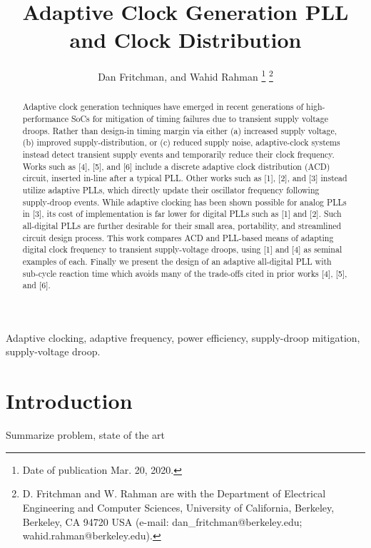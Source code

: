 \documentclass{IEEEtran}
\begin{document}
\title{  Adaptive Clock Generation PLL and Clock Distribution }

\author{
	Dan Fritchman,  and Wahid Rahman 
	\thanks{Date of publication Mar. 20, 2020.}
	\thanks{
		D. Fritchman and W. Rahman are with the Department of Electrical Engineering and Computer Sciences, University of California, Berkeley, Berkeley, CA 94720 USA (e-mail: dan\_fritchman@berkeley.edu; wahid.rahman@berkeley.edu).}
}

\maketitle

\begin{abstract}
Adaptive clock generation techniques have emerged in recent generations of high-performance SoCs for mitigation of timing failures due to transient supply voltage droops. Rather than design-in timing margin via either (a) increased supply voltage, (b) improved supply-distribution, or (c) reduced supply noise, adaptive-clock systems instead detect transient supply events and temporarily reduce their clock frequency. Works such as [4], [5], and [6] include a discrete adaptive clock distribution (ACD) circuit, inserted in-line after a typical PLL. Other works such as [1], [2], and [3] instead utilize adaptive PLLs, which directly update their oscillator frequency following supply-droop events. While adaptive clocking has been shown possible for analog PLLs in [3], its cost of implementation is far lower for digital PLLs such as [1] and [2]. Such all-digital PLLs are further desirable for their small area, portability, and streamlined circuit design process. This work compares ACD and PLL-based means of adapting digital clock frequency to transient supply-voltage droops, using [1] and [4] as seminal examples of each. Finally we present the design of an adaptive all-digital PLL with sub-cycle reaction time which avoids many of the trade-offs cited in prior works [4], [5], and [6].
\end{abstract}

\begin{IEEEkeywords}
Adaptive clocking, adaptive frequency, power efficiency, supply-droop mitigation, supply-voltage droop.
\end{IEEEkeywords}

\section{Introduction}
Summarize problem, state of the art
\end{document}
